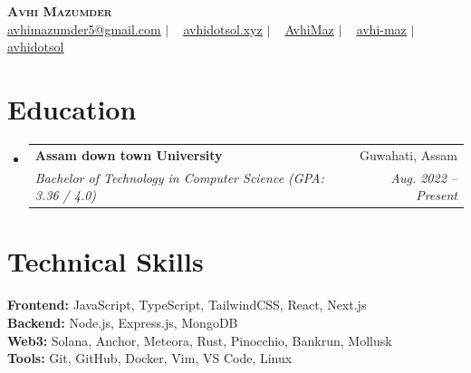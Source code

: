 \documentclass[letterpaper,11pt]{article}
\makeatletter
\newcommand{\resumeSubheading}[4]{
  \vspace{-2pt}\item
    \begin{tabular*}{0.97\textwidth}[t]{l@{\extracolsep{\fill}}r}
      \textbf{#1} & #2 \\
      \textit{\small#3} & \textit{\small #4} \\
    \end{tabular*}\vspace{-7pt}
}
\newcommand{\resumeSubHeadingListStart}{\begin{itemize}[leftmargin=0.15in, label={}]}
\newcommand{\resumeSubHeadingListEnd}{\end{itemize}}
\makeatother
\begin{document}
\begin{center}
  \textbf{\Huge \scshape Avhi Mazumder} \\ \vspace{5pt}
  \small
  \hspace{0.1em}
  \href{mailto:avhimazumder5@gmail.com}{\underline{avhimazumder5@gmail.com}} $|$ \ 
  \hspace{0.1em}
  \href{https://avhidotsol.xyz/}{\underline{avhidotsol.xyz}} $|$ \ 
  \hspace{0.1em}
  \href{https://github.com/AvhiMaz}{\underline{AvhiMaz}} $|$ \ 
  \hspace{0.1em}
  \href{https://www.linkedin.com/in/avhi-maz/}{\underline{avhi-maz}} $|$ \ 
  \hspace{0.1em}
  \href{https://www.x.com/avhidotsol/}{\underline{avhidotsol}}
\end{center}

\section{Education}
  \resumeSubHeadingListStart

    \resumeSubheading
      {Assam down town University}{Guwahati, Assam}
      {Bachelor of Technology in Computer Science \newline\space(GPA: 3.36 / 4.0)}{Aug. 2022 -- Present}

  \resumeSubHeadingListEnd

\section{Technical Skills}
\begin{itemize}[leftmargin=0.15in, label={}]
  \small{\item{
    \textbf{Frontend:} JavaScript, TypeScript, TailwindCSS, React, Next.js \\
    \textbf{Backend:} Node.js, Express.js, MongoDB \\
    \textbf{Web3:} Solana, Anchor, Meteora, Rust, Pinocchio, Bankrun, Mollusk \\
    \textbf{Tools:} Git, GitHub, Docker, Vim, VS Code, Linux
  }}
\end{itemize}
\end{document}
